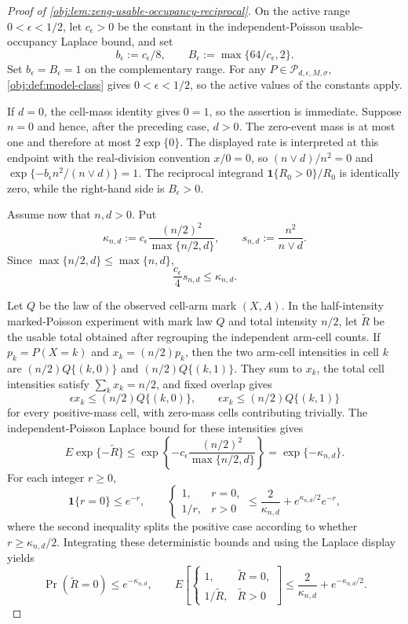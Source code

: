 \begin{proof}[Proof of \cref{obj:lem:zeng-usable-occupancy-reciprocal}]
On the active range \(0<\epsilon<1/2\), let \(c_\epsilon>0\) be the constant in the independent-Poisson usable-occupancy Laplace bound, and set
\[
b_\epsilon:=c_\epsilon/8,\qquad B_\epsilon:=\max\{64/c_\epsilon,2\}.
\]
Set \(b_\epsilon=B_\epsilon=1\) on the complementary range.  For any \(P\in\mathcal P_{d,\epsilon,M,\sigma}\), \cref{obj:def:model-class} gives \(0<\epsilon<1/2\), so the active values of the constants apply. %

If \(d=0\), the cell-mass identity gives \(0=1\), so the assertion is immediate.  Suppose \(n=0\) and hence, after the preceding case, \(d>0\).  The zero-event mass is at most one and therefore at most \(2\exp\{0\}\).  The displayed rate is interpreted at this endpoint with the real-division convention \(x/0=0\), so \((n\vee d)/n^2=0\) and \(\exp\{-b_\epsilon n^2/(n\vee d)\}=1\).  The reciprocal integrand \(\mathbf 1\{R_0>0\}/R_0\) is identically zero, while the right-hand side is \(B_\epsilon>0\). %

Assume now that \(n,d>0\).  Put
\[
\kappa_{n,d}:=c_\epsilon\frac{(n/2)^2}{\max\{n/2,d\}},\qquad
s_{n,d}:=\frac{n^2}{n\vee d}.
\]
Since \(\max\{n/2,d\}\le \max\{n,d\}\),
\[
\frac{c_\epsilon}{4}s_{n,d}\le \kappa_{n,d}.
\]

Let \(Q\) be the law of the observed cell-arm mark \((X,A)\).  In the half-intensity marked-Poisson experiment with mark law \(Q\) and total intensity \(n/2\), let \(\widetilde R\) be the usable total obtained after regrouping the independent arm-cell counts.  If \(p_k=P(X=k)\) and \(x_k=(n/2)p_k\), then the two arm-cell intensities in cell \(k\) are \((n/2)Q\{(k,0)\}\) and \((n/2)Q\{(k,1)\}\).  They sum to \(x_k\), the total cell intensities satisfy \(\sum_k x_k=n/2\), and fixed overlap gives
\[
\epsilon x_k\le (n/2)Q\{(k,0)\},\qquad
\epsilon x_k\le (n/2)Q\{(k,1)\}
\]
for every positive-mass cell, with zero-mass cells contributing trivially.  The independent-Poisson Laplace bound for these intensities gives
\[
E\exp\{-\widetilde R\}
\le
\exp\left\{-c_\epsilon\frac{(n/2)^2}{\max\{n/2,d\}}\right\}
=\exp\{-\kappa_{n,d}\}.
\]
For each integer \(r\ge0\),
\[
\mathbf 1\{r=0\}\le e^{-r},\qquad
\begin{cases}
1,& r=0,\\
1/r,& r>0
\end{cases}
\le \frac{2}{\kappa_{n,d}}+e^{\kappa_{n,d}/2}e^{-r},
\]
where the second inequality splits the positive case according to whether \(r\ge \kappa_{n,d}/2\).  Integrating these deterministic bounds and using the Laplace display yields
\[
\Pr(\widetilde R=0)\le e^{-\kappa_{n,d}},\qquad
E\left[\begin{cases}
1,& \widetilde R=0,\\
1/\widetilde R,& \widetilde R>0
\end{cases}\right]
\le \frac{2}{\kappa_{n,d}}+e^{-\kappa_{n,d}/2}.
\]


\end{proof}
